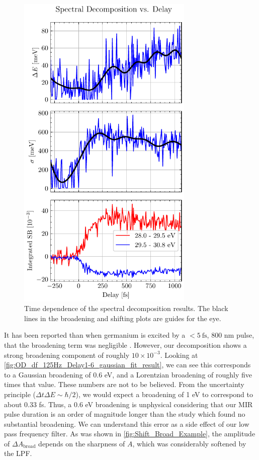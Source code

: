 \begin{figure}
	\centering
	\includegraphics[width=0.75\textwidth]{figures/chap4/OD_df_125Hz_Delay1-6_gaussian_shift_broad.pdf}
	\caption{Time dependence of the spectral decomposition results. The black lines in the broadening and shifting plots are guides for the eye.}
	\label{fig:OD_df_125Hz_Delay1-6_gaussian_shift_broad}
\end{figure}

It has been reported than when germanium is excited by a $< 5 \ \textrm{fs}$, 800 nm pulse, that the broadening term was negligible \cite{zurchDirectSimultaneousObservation2017}. However, our decomposition shows a strong broadening component of roughly $10 \times 10^{-3}$. Looking at \cref{fig:OD_df_125Hz_Delay1-6_gaussian_fit_result}, we can see this corresponds to a Gaussian broadening of 0.6 eV, and a Lorentzian broadening of roughly five times that value. These numbers are not to be believed. From the uncertainty principle ($\Delta t \Delta E \sim \hbar/2$), we would expect a broadening of 1 eV to correspond to about 0.33 fs. Thus, a 0.6 eV broadening is unphysical considering that our MIR pulse duration is an order of magnitude longer than the study which found no substantial broadening. We can understand this error as a side effect of our low pass frequency filter. As was shown in \cref{fig:Shift_Broad_Example}, the amplitude of $\Delta A_{\textrm{broad}}$ depends on the sharpness of $A$, which was considerably softened by the LPF.

